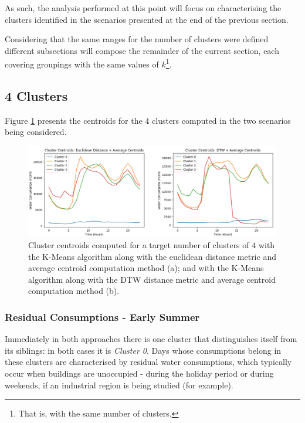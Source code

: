 \documentclass[9pt,journal,compsoc]{IEEEtran}
\begin{document}
As such, the analysis performed at this point will focus on characterising the clusters identified in the scenarios presented at the end of the previous section.

Considering that the same ranges for the number of clusters were defined different subsections will compose the remainder of the current section, each covering groupings with the same values of $k$\footnote{That is, with the same number of clusters.}.

\subsection{4 Clusters}

Figure \ref{centroids_4clusters} presents the centroids for the $4$ clusters computed in the two scenarios being considered.

\begin{figure}
	\centering
	\includegraphics[scale=0.4]{images/centroids_4_clusters.png}
	\caption{Cluster centroids computed for a target number of clusters of $4$ with the K-Means algorithm along with the euclidean distance metric and average centroid computation method (a); and with the K-Means algorithm along with the DTW distance metric and average centroid computation method (b).}
	\label{centroids_4clusters}
\end{figure}

\subsubsection{Residual Consumptions - Early Summer}
\label{residual_consumptions}

Immediately in both approaches there is one cluster that distinguishes itself from its siblings: in both cases it is \emph{Cluster 0}. Days whose consumptions belong in these clusters are characterised by residual water consumptions, which typically occur when buildings are unoccupied - during the holiday period or during weekends, if an industrial region is being studied (for example).
\end{document}
